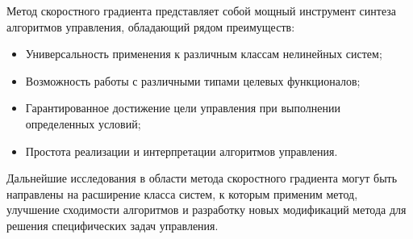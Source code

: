 \documentclass[14pt,a4paper]{article}
\begin{document}
Метод скоростного градиента представляет собой мощный инструмент синтеза алгоритмов управления, обладающий рядом преимуществ:
\begin{itemize}
    \item Универсальность применения к различным классам нелинейных систем;
    \item Возможность работы с различными типами целевых функционалов;
    \item Гарантированное достижение цели управления при выполнении определенных условий;
    \item Простота реализации и интерпретации алгоритмов управления.
\end{itemize}

Дальнейшие исследования в области метода скоростного градиента могут быть направлены на расширение класса систем, к которым применим метод, улучшение сходимости алгоритмов и разработку новых модификаций метода для решения специфических задач управления.
\end{document}
